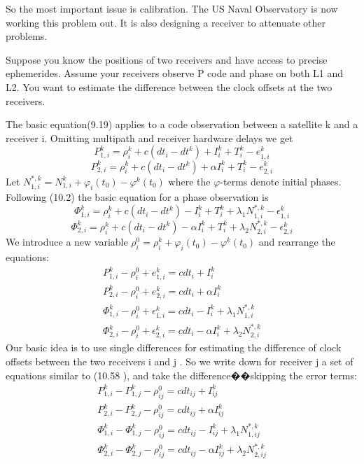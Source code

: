 So the most important issue is calibration. The US Naval Observatory is now working this problem out. It is also designing a receiver to attenuate other problems.

Suppose you know the positions of two receivers and have access to precise ephemerides. Assume your receivers observe P code and phase on both L1 and L2. You want to estimate the difference between the clock offsets at the two receivers.

The basic equation(9.19) applies to a code observation between a satellite k and a receiver i. Omitting multipath and receiver hardware delays we get
$$
P_{1,i}^{k}=\rho_{i}^{k}+c(dt_{i}-dt^{k})+I_{i}^{k}+T_{i}^{k}-e_{1,i}^{k}
$$
$$
P_{2,i}^{k}=\rho_{i}^{k}+c(dt_{i}-dt^{k})+\alpha I_{i}^{k}+T_{i}^{k}-e_{2,i}^{k}
$$
Let $N_{1,i}^{*,k}=N_{1,i}^{k}+\varphi_{i}(t_{0})-\varphi^{k}(t_{0})$ where the $\varphi$-terms denote initial phases. Following (10.2) the basic equation for a phase observation is
$$
\Phi_{1,i}^{k}=\rho_{i}^{k}+c(dt_{i}-dt^{k})-I_{i}^{k}+T_{i}^{k}+\lambda_{1}N_{1,i}^{*,k}-\epsilon_{1,i}^{k}
$$
$$
\Phi_{2,i}^{k}=\rho_{i}^{k}+c(dt_{i}-dt^{k})-\alpha I_{i}^{k}+T_{i}^{k}+\lambda_{2}N_{2,i}^{*,k}-\epsilon_{2,i}^{k}
$$
We introduce a new variable $\rho_{i}^{0}=\rho_{i}^{k}+\varphi_{i}(t_{0})-\varphi^{k}(t_{0})$ and rearrange the equations:
\begin{equation}
\begin{split}
P_{1,i}^{k}-\rho_{i}^{0}+e_{1,i}^{k}=cdt_{i}+I_{i}^{k}\\
P_{2,i}^{k}-\rho_{i}^{0}+e_{2,i}^{k}=cdt_{i}+\alpha I_{i}^{k}\\
\Phi_{1,i}^{k}-\rho_{i}^{0}+\epsilon_{1,i}^{k}=cdt_{i}-I_{i}^{k}+\lambda_{1}N_{1,i}^{*,k}\\
\Phi_{2,i}^{k}-\rho_{i}^{0}+\epsilon_{2,i}^{k}=cdt_{i}-\alpha I_{i}^{k}+\lambda_{2}N_{2,i}^{*,k}
\end{split}
\end{equation}
Our basic idea is to use single differences for estimating the difference of clock offsets
between the two receivers i and j . So we write down for receiver j a set of equations
similar to (10.58 ), and take the difference��skipping the error terms:
\begin{equation}
\begin{split}
P_{1,i}^{k}-P_{1,j}^{k}-\rho_{ij}^{0}=cdt_{ij}+I_{ij}^{k}\\
P_{2,i}^{k}-P_{2,j}^{k}-\rho_{ij}^{0}=cdt_{ij}+\alpha I_{ij}^{k}\\
\Phi_{1,i}^{k}-\Phi_{1,j}^{k}-\rho_{ij}^{0}=cdt_{ij}-I_{ij}^{k}+\lambda_{1}N_{1,ij}^{*,k}\\
\Phi_{2,i}^{k}-\Phi_{2,j}^{k}-\rho_{ij}^{0}=cdt_{ij}-\alpha I_{ij}^{k}+\lambda_{2}N_{2,ij}^{*,k}
\end{split}
\end{equation}
